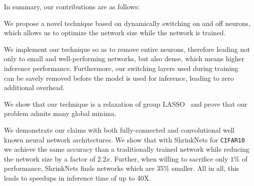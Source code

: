 In summary, our contributions are as follows: 

\begin{compactenum}

\item We propose a novel technique based on dynamically switching on and off neurons, 
which allows us to optimize the network size while the network is trained. 

\item We implement our technique so as to remove entire neurons, therefore
leading not only to small and well-performing networks, but also dense, which
means higher inference performance. Furthermore, our switching layers used during training can be 
savely removed before the model is used for inference, leading to zero additional overhead. 


\item We show that our technique is a relaxation of group LASSO~\cite{Yuan2006}
and prove that our problem admits many global minima.

\item We demonstrate our claims with both fully-connected and convolutional well
known neural network architectures. We show that with ShrinkNets for
\texttt{CIFAR10} we achieve the same accuracy than a traditionally trained
network while reducing the network size by a factor of $2.2x$. Further, when
willing to sacrifice only $1$\% of performance, ShrinkNets finds networks which
are 35\% smaller. All in all, this leads to speedups in inference time of up to
40X. 


%
%

\end{compactenum}



